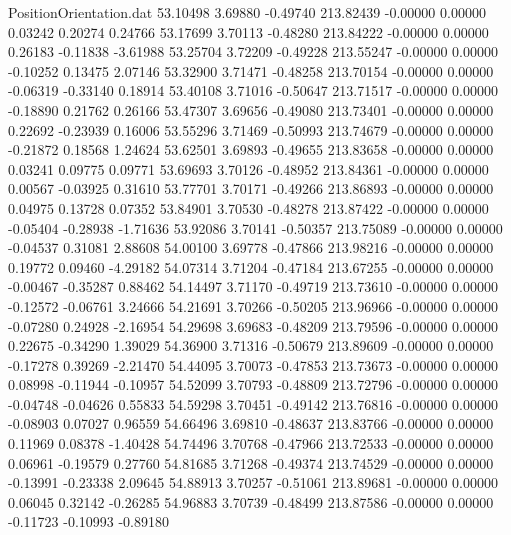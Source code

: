 \begin{filecontents}{PositionOrientation.dat}
  53.10498    3.69880   -0.49740   213.82439   -0.00000    0.00000    0.03242    0.20274    0.24766
  53.17699    3.70113   -0.48280   213.84222   -0.00000    0.00000    0.26183   -0.11838   -3.61988
  53.25704    3.72209   -0.49228   213.55247   -0.00000    0.00000   -0.10252    0.13475    2.07146
  53.32900    3.71471   -0.48258   213.70154   -0.00000    0.00000   -0.06319   -0.33140    0.18914
  53.40108    3.71016   -0.50647   213.71517   -0.00000    0.00000   -0.18890    0.21762    0.26166
  53.47307    3.69656   -0.49080   213.73401   -0.00000    0.00000    0.22692   -0.23939    0.16006
  53.55296    3.71469   -0.50993   213.74679   -0.00000    0.00000   -0.21872    0.18568    1.24624
  53.62501    3.69893   -0.49655   213.83658   -0.00000    0.00000    0.03241    0.09775    0.09771
  53.69693    3.70126   -0.48952   213.84361   -0.00000    0.00000    0.00567   -0.03925    0.31610
  53.77701    3.70171   -0.49266   213.86893   -0.00000    0.00000    0.04975    0.13728    0.07352
  53.84901    3.70530   -0.48278   213.87422   -0.00000    0.00000   -0.05404   -0.28938   -1.71636
  53.92086    3.70141   -0.50357   213.75089   -0.00000    0.00000   -0.04537    0.31081    2.88608
  54.00100    3.69778   -0.47866   213.98216   -0.00000    0.00000    0.19772    0.09460   -4.29182
  54.07314    3.71204   -0.47184   213.67255   -0.00000    0.00000   -0.00467   -0.35287    0.88462
  54.14497    3.71170   -0.49719   213.73610   -0.00000    0.00000   -0.12572   -0.06761    3.24666
  54.21691    3.70266   -0.50205   213.96966   -0.00000    0.00000   -0.07280    0.24928   -2.16954
  54.29698    3.69683   -0.48209   213.79596   -0.00000    0.00000    0.22675   -0.34290    1.39029
  54.36900    3.71316   -0.50679   213.89609   -0.00000    0.00000   -0.17278    0.39269   -2.21470
  54.44095    3.70073   -0.47853   213.73673   -0.00000    0.00000    0.08998   -0.11944   -0.10957
  54.52099    3.70793   -0.48809   213.72796   -0.00000    0.00000   -0.04748   -0.04626    0.55833
  54.59298    3.70451   -0.49142   213.76816   -0.00000    0.00000   -0.08903    0.07027    0.96559
  54.66496    3.69810   -0.48637   213.83766   -0.00000    0.00000    0.11969    0.08378   -1.40428
  54.74496    3.70768   -0.47966   213.72533   -0.00000    0.00000    0.06961   -0.19579    0.27760
  54.81685    3.71268   -0.49374   213.74529   -0.00000    0.00000   -0.13991   -0.23338    2.09645
  54.88913    3.70257   -0.51061   213.89681   -0.00000    0.00000    0.06045    0.32142   -0.26285
  54.96883    3.70739   -0.48499   213.87586   -0.00000    0.00000   -0.11723   -0.10993   -0.89180

\end{filecontents}
